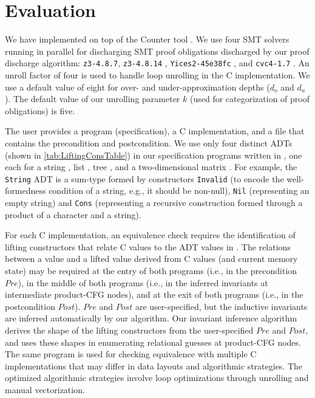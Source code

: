 \section{Evaluation}
\label{sec:eval}

We have implemented \toolName{} on top of the
Counter tool \cite{oopsla20}.
We use four SMT solvers running in parallel for discharging
SMT proof obligations discharged by our proof discharge algorithm:
{\tt z3-4.8.7}, {\tt z3-4.8.14} \cite{z3},
{\tt Yices2-45e38fc} \cite{yices},
and {\tt cvc4-1.7} \cite{cvc4solver}.
An unroll factor of four is used to handle loop unrolling in the C implementation.
We use a default value of eight for
over- and under-approximation depths ($d_o$ and $d_u$).
The default value of
our unrolling parameter $k$ (used for categorization of proof obligations) is five.

The user provides a \SpecL{} program (specification), a C implementation,
and a file that contains the precondition and postcondition.
We use only four distinct ADTs (shown in \cref{tab:LiftingConsTable}) in our specification
programs written in \SpecL{}, one each for a string , list ,
tree , and a two-dimensional
matrix .
For example, the {\tt String} ADT is a sum-type formed by constructors
{\tt Invalid} (to
encode the well-formedness condition of a string, e.g., it should be non-null),
{\tt Nil} (representing an empty string) and {\tt Cons} (representing
a recursive construction formed through a product of a character and a string).

For each C implementation, an equivalence check requires the identification of
lifting constructors that relate C values to the ADT values in \SpecL{}.
The relations between a \SpecL{} value and a lifted value derived from C values (and current memory state)
may be required at the entry of both programs (i.e., in the precondition $Pre$),
in the middle of both programs (i.e., in the inferred invariants at intermediate product-CFG
nodes), and at the exit of both programs (i.e., in the postcondition $Post$).
$Pre$ and $Post$ are user-specified, but the inductive invariants are inferred
automatically by our algorithm.
 Our invariant inference algorithm derives
the shape of the lifting constructors from the user-specified $Pre$ and $Post$,
and uses these shapes in enumerating relational guesses at product-CFG nodes.
The same \SpecL{} program
is used for checking equivalence with multiple C implementations that may differ
in data layouts and algorithmic strategies.
The optimized algorithmic strategies involve
loop optimizations through unrolling and manual vectorization.

